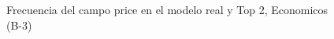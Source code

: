 \begin{figure}[H]
    \centering
    
    \caption{Frecuencia del campo  price en el modelo real y Top 2, Economicos (B-3)}
    \label{frecuency- Price-top2}
\end{figure}